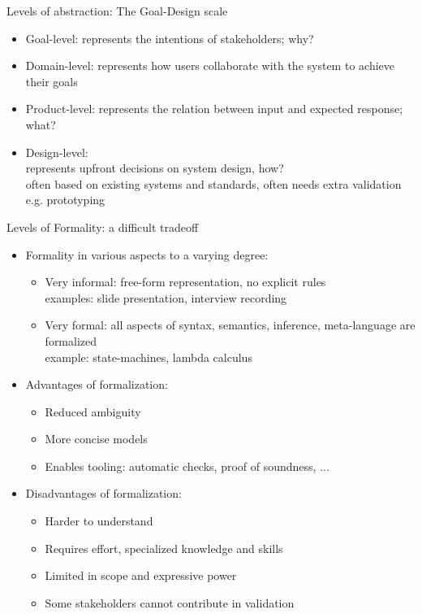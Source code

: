 \documentclass{simpleslides}
\begin{document}
\begin{frame}[fragile]{Levels of abstraction: The Goal-Design scale}
\begin{itemize}
\item Goal-level: represents the intentions of stakeholders; why? 
\item Domain-level: represents how users collaborate with the system to achieve their goals
\item Product-level: represents the relation between input and expected response; what?
\item Design-level:\\represents upfront decisions on system design, how?\\often based on existing systems and standards, often needs extra validation e.g. prototyping
\end{itemize}
\end{frame}

\begin{frame}[fragile]{Levels of Formality: a difficult tradeoff}

\begin{itemize}
\item Formality in various aspects to a varying degree: 
\begin{itemize}
  \item Very informal: free-form representation, no explicit rules\\examples: slide presentation, interview recording
  \item Very formal: all aspects of syntax, semantics, inference, meta-language are formalized\\example: state-machines, lambda calculus
\end{itemize}
\item Advantages of formalization:
\begin{itemize}
\item Reduced ambiguity
\item More concise models
\item Enables tooling: automatic checks, proof of soundness, ... 
\end{itemize}
\item Disadvantages of formalization:
\begin{itemize}
\item Harder to understand
\item Requires effort, specialized knowledge and skills
\item Limited in scope and expressive power
\item Some stakeholders cannot contribute in validation 
\end{itemize}
\end{itemize}
\end{frame}
\end{document}

